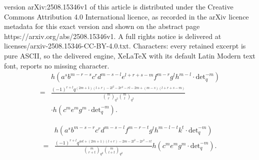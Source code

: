 \documentclass[10pt,a4paper]{amsart}
\begin{document}
version arXiv:2508.15346v1 of this article is distributed under the Creative Commons Attribution 4.0 International licence, as recorded in the arXiv licence metadata for this exact version and shown on the abstract page https://arxiv.org/abs/2508.15346v1. A full rights notice is delivered at licenses/arxiv-2508.15346-CC-BY-4.0.txt. Characters: every retained excerpt is pure ASCII, so the delivered engine, XeLaTeX with its default Latin Modern text font, reports no missing character.
\begin{equation}\label{eq:4.57}
    \begin{split}
        &h(a^sb^{m-r-s}c^{r}d^{m-s-l}e^{l+r+s-m}f^{m-r}g^{l}h^{m-l}\cdot\text{det}_q^{-m})\\
        =&\frac{(-1)^{r+l}q^{(2m+1)(l+r)-2l^2-2r^2-rl-2m+(m-s)(l+r+s-m)}}{{m\choose r}_{q^2}{m\choose l}_{q^2}}\\
        &\cdot h\left(c^me^mg^m\cdot\text{det}_q^{-m}\right).
    \end{split}
\end{equation}

\begin{equation}\label{eq:4.63}
    \begin{split}
        &h\left(a^sb^{m-s-r}c^rd^{m-s-l}f^{m-r-t}g^lh^{m-l-t}k^{t}\cdot\text{det}_q^{-m}\right)\\
        =&\frac{(-1)^{r+l}q^{4st+(2m+1)(l+r)-2m-2l^2-2r^2-rl}}{{m\choose r+t}_{q^2}{m\choose l+t}_{q^2}}h\left(c^me^mg^m\cdot\text{det}_q^{-m}\right).
    \end{split}
\end{equation}
\end{document}
